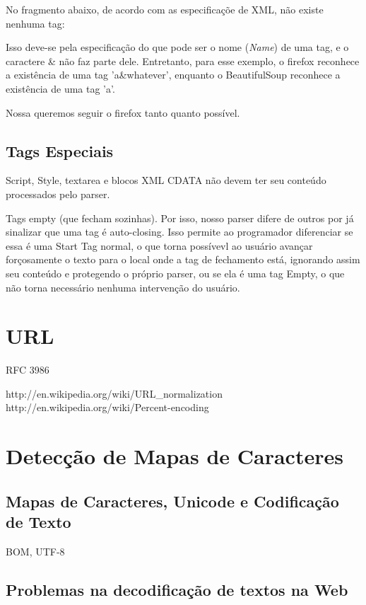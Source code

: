 No fragmento abaixo, de acordo com as especificaçõe de XML, não existe nenhuma tag:

Isso deve-se pela especificação do que pode ser o nome (\emph{Name}) de uma tag, e o caractere \& não faz parte dele. Entretanto, para esse exemplo, o firefox reconhece a existência de uma tag 'a&whatever', enquanto o BeautifulSoup reconhece a existência de uma tag 'a'.

Nossa queremos seguir o firefox tanto quanto possível.

\subsection{Tags Especiais}

Script, Style, textarea e blocos XML CDATA não devem ter seu conteúdo processados pelo parser.

Tags empty (que fecham sozinhas). Por isso, nosso parser difere de outros por
já sinalizar que uma tag é auto-closing. Isso permite ao programador
diferenciar se essa é uma Start Tag normal, o que torna possívevl ao usuário
avançar forçosamente o texto para o local onde a tag de fechamento está,
ignorando assim seu conteúdo e protegendo o próprio parser, ou se ela é uma tag
Empty, o que não torna necessário nenhuma intervenção do usuário.

\section{URL}

RFC 3986

http://en.wikipedia.org/wiki/URL_normalization
http://en.wikipedia.org/wiki/Percent-encoding




\section{Detecção de Mapas de Caracteres}

\subsection{Mapas de Caracteres, Unicode e Codificação de Texto}
BOM, UTF-8

\subsection{Problemas na decodificação de textos na Web}

